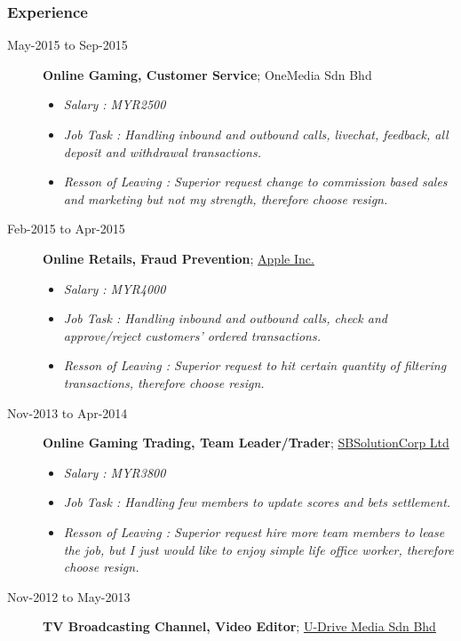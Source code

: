 \documentclass[]{article}
\providecommand{\tightlist}{%
  \setlength{\itemsep}{0pt}\setlength{\parskip}{0pt}}
\begin{document}
\subsubsection{Experience}\label{experience}

\begin{description}
\item[May-2015 to Sep-2015]
\textbf{Online Gaming, Customer Service}; OneMedia Sdn Bhd

\begin{itemize}
\tightlist
\item
  \emph{Salary : MYR2500}
\item
  \emph{Job Task : Handling inbound and outbound calls, livechat,
  feedback, all deposit and withdrawal transactions.}
\item
  \emph{Resson of Leaving : Superior request change to commission based
  sales and marketing but not my strength, therefore choose resign.}
\end{itemize}
\item[Feb-2015 to Apr-2015]
\textbf{Online Retails, Fraud Prevention};
\href{http://www.apple.com}{Apple Inc.}

\begin{itemize}
\tightlist
\item
  \emph{Salary : MYR4000}
\item
  \emph{Job Task : Handling inbound and outbound calls, check and
  approve/reject customers' ordered transactions.}
\item
  \emph{Resson of Leaving : Superior request to hit certain quantity of
  filtering transactions, therefore choose resign.}
\end{itemize}
\item[Nov-2013 to Apr-2014]
\textbf{Online Gaming Trading, Team Leader/Trader};
\href{http://www.gb-links.com/}{SBSolutionCorp Ltd}

\begin{itemize}
\tightlist
\item
  \emph{Salary : MYR3800}
\item
  \emph{Job Task : Handling few members to update scores and bets
  settlement.}
\item
  \emph{Resson of Leaving : Superior request hire more team members to
  lease the job, but I just would like to enjoy simple life office
  worker, therefore choose resign.}
\end{itemize}
\item[Nov-2012 to May-2013]
\textbf{TV Broadcasting Channel, Video Editor};
\href{http://www.udrive-media.com/}{U-Drive Media Sdn Bhd}


\end{description}
\end{document}
